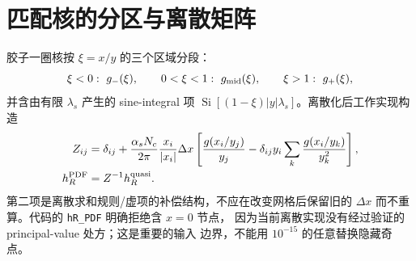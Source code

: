 \documentclass[UTF8,11pt,oneside]{ctexbook}
\begin{document}
\section{匹配核的分区与离散矩阵}
胶子一圈核按 \(\xi=x/y\) 的三个区域分段：
\begin{equation}
 \xi<0:\ g_{-}(\xi),\qquad
 0<\xi<1:\ g_{\rm mid}(\xi),\qquad
 \xi>1:\ g_{+}(\xi),
\end{equation}
并含由有限 \(\lambda_s\) 产生的 sine-integral 项
\(\operatorname{Si}[(1-\xi)|y|\lambda_s]\)。离散化后工作实现构造
\begin{align}
 Z_{ij}&=\delta_{ij}+\frac{\alpha_sN_c}{2\pi}
 \frac{x_i}{|x_i|}\Delta x
 \left[\frac{g(x_i/y_j)}{y_j}
 -\delta_{ij}y_i\sum_k\frac{g(x_i/y_k)}{y_k^2}\right],\\
 h_R^{\rm PDF}&=Z^{-1}h_R^{\rm quasi}.
 \label{eq:matching-matrix-clean}
\end{align}
第二项是离散求和规则/虚项的补偿结构，不应在改变网格后保留旧的
\(\Delta x\) 而不重算。代码的 \texttt{hR\_PDF} 明确拒绝含 \(x=0\) 节点，
因为当前离散实现没有经过验证的 principal-value 处方；这是重要的输入
边界，不能用 \(10^{-15}\) 的任意替换隐藏奇点。
\end{document}
